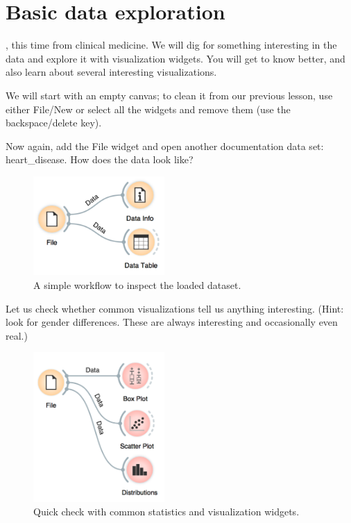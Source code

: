 \chapter{Basic data exploration}
\label{ch:basic_data_exploration}

, this time from clinical medicine. We will dig for something interesting in the data and explore it with visualization widgets. You will get to know \mutation better, and also learn about several interesting visualizations.

We will start with an empty canvas; to clean it from our previous lesson, use either File/New or select all the widgets and remove them (use the backspace/delete key).

Now again, add the File widget and open another documentation data set: heart\_disease. How does the data look like?

\begin{figure}[h]
  \centering
  \includegraphics[width=50mm]{basic_data_exploration-fig1.png}%
  \caption{A simple workflow to inspect the loaded dataset.}
  \label{fig:basic_data_exploration-fig1}
\end{figure}

Let us check whether common visualizations tell us anything interesting. (Hint: look for gender differences. These are always interesting and occasionally even real.)

\begin{figure}[h]
  \centering
  \includegraphics[width=50mm]{basic_data_exploration-fig2.png}%
  \caption{Quick check with common statistics and visualization widgets.}
  \label{fig:basic_data_exploration-fig2}
\end{figure}

